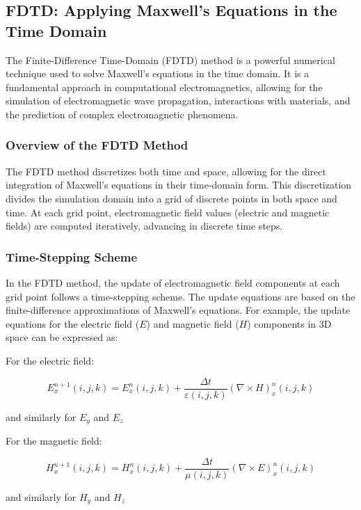 \documentclass[11pt, a4paper, titlepage]{article}
\begin{document}
\newpage
\subsection{FDTD: Applying Maxwell's Equations in the Time Domain}

The Finite-Difference Time-Domain (FDTD) method is a powerful numerical technique used to solve Maxwell's equations in the time domain. It is a fundamental approach in computational electromagnetics, allowing for the simulation of electromagnetic wave propagation, interactions with materials, and the prediction of complex electromagnetic phenomena.

\subsubsection{Overview of the FDTD Method}

The FDTD method discretizes both time and space, allowing for the direct integration of Maxwell's equations in their time-domain form. This discretization divides the simulation domain into a grid of discrete points in both space and time. At each grid point, electromagnetic field values (electric and magnetic fields) are computed iteratively, advancing in discrete time steps.

\subsubsection{Time-Stepping Scheme}

In the FDTD method, the update of electromagnetic field components at each grid point follows a time-stepping scheme. The update equations are based on the finite-difference approximations of Maxwell's equations. For example, the update equations for the electric field (\(E\)) and magnetic field (\(H\)) components in 3D space can be expressed as:

\begin{center} For the electric field: \end{center}
\[
E_x^{n+1}(i,j,k) = E_x^n(i,j,k) + \frac{\Delta t}{\varepsilon(i,j,k)} \left(\nabla \times H\right)_x^n(i,j,k)
\]
\begin{center}and similarly for  $E_y$ and $E_z$\end{center}



\begin{center}For the magnetic field:\end{center}
\[
H_x^{n+1}(i,j,k) = H_x^n(i,j,k) + \frac{\Delta t}{\mu(i,j,k)} \left(\nabla \times E\right)_x^n(i,j,k)
\]
 \begin{center}and similarly for $H_y$ and $H_z$\end{center}
 
\end{document}
